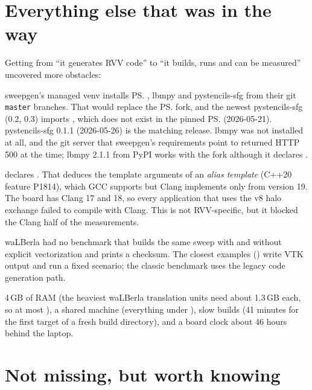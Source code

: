 \section{Everything else that was in the way}\label{r02:sec:gap-other}

Getting from ``it generates RVV code'' to ``it builds, runs and can be measured''
uncovered more obstacles:
\begin{description}[style=nextline]
  \item[Python package versions] sweepgen's managed venv installs \ps{}, lbmpy and
    pystencils-sfg from their git \texttt{master} branches. That would replace the
    \ps{} fork, and the newest pystencils-sfg (0.2, 0.3) imports
    , which does not exist in the pinned \ps{} (2026-05-21).
    pystencils-sfg 0.1.1 (2026-05-26) is the matching release. lbmpy was not installed
    at all, and the git server that sweepgen's requirements point to returned HTTP 500
    at the time; lbmpy 2.1.1 from PyPI works with the fork although it declares
    .
  \item[Clang 18 and the v8 halo exchange]  declares
    . That deduces the template
    arguments of an \emph{alias template} (C++20 feature P1814), which GCC supports but
    Clang implements only from version 19. The board has Clang 17 and 18, so every
    application that uses the v8 halo exchange failed to compile with Clang. This is
    not RVV-specific, but it blocked the Clang half of the measurements.
  \item[No way to measure] waLBerla had no benchmark that builds the same sweep with
    and without explicit vectorization and prints a checksum. The closest examples
    () write VTK output and run a fixed scenario; the classic
     benchmark uses the legacy code generation path.
  \item[Board constraints] 4\,GB of RAM (the heaviest waLBerla translation units need
    about 1.3\,GB each, so at most ), a shared machine (everything under
    ), slow builds (41 minutes for the first target of a
    fresh build directory), and a board clock about 46 hours behind the laptop.
\end{description}

\section{Not missing, but worth knowing}\label{r02:sec:gap-not}

